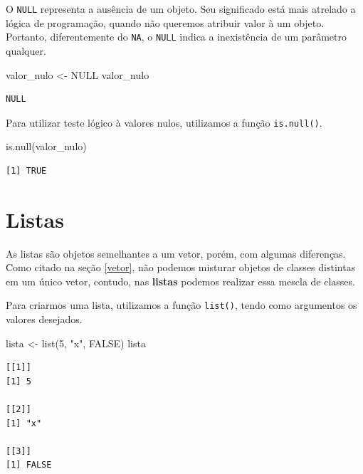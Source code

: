 \documentclass[
  brazilian,
]{book}
\newenvironment{Shaded}{\begin{snugshade}}{\end{snugshade}}
\newcommand{\ConstantTok}[1]{\textcolor[rgb]{0.00,0.00,0.00}{#1}}
\newcommand{\DecValTok}[1]{\textcolor[rgb]{0.00,0.00,0.81}{#1}}
\newcommand{\FunctionTok}[1]{\textcolor[rgb]{0.00,0.00,0.00}{#1}}
\newcommand{\NormalTok}[1]{#1}
\newcommand{\OtherTok}[1]{\textcolor[rgb]{0.56,0.35,0.01}{#1}}
\newcommand{\StringTok}[1]{\textcolor[rgb]{0.31,0.60,0.02}{#1}}
\begin{document}
O \texttt{NULL} representa a ausência de um objeto. Seu significado está mais atrelado a lógica de programação, quando não queremos atribuir valor à um objeto. Portanto, diferentemente do \texttt{NA}, o \texttt{NULL} indica a inexistência de um parâmetro qualquer.

\begin{Shaded}
\begin{Highlighting}[]
\NormalTok{valor\_nulo }\OtherTok{\textless{}{-}} \ConstantTok{NULL}
\NormalTok{valor\_nulo}
\end{Highlighting}
\end{Shaded}

\begin{verbatim}
NULL
\end{verbatim}

Para utilizar teste lógico à valores nulos, utilizamos a função \texttt{is.null()}.

\begin{Shaded}
\begin{Highlighting}[]
\FunctionTok{is.null}\NormalTok{(valor\_nulo)}
\end{Highlighting}
\end{Shaded}

\begin{verbatim}
[1] TRUE
\end{verbatim}

\hypertarget{list}{%
\section{Listas}\label{list}}

As listas são objetos semelhantes a um vetor, porém, com algumas diferenças. Como citado na seção \ref{vetor}, não podemos misturar objetos de classes distintas em um único vetor, contudo, nas \textbf{listas} podemos realizar essa mescla de classes.

Para criarmos uma lista, utilizamos a função \texttt{list()}, tendo como argumentos os valores desejados.

\begin{Shaded}
\begin{Highlighting}[]
\NormalTok{lista }\OtherTok{\textless{}{-}} \FunctionTok{list}\NormalTok{(}\DecValTok{5}\NormalTok{, }\StringTok{"x"}\NormalTok{, }\ConstantTok{FALSE}\NormalTok{)}
\NormalTok{lista}
\end{Highlighting}
\end{Shaded}

\begin{verbatim}
[[1]]
[1] 5

[[2]]
[1] "x"

[[3]]
[1] FALSE
\end{verbatim}
\end{document}
